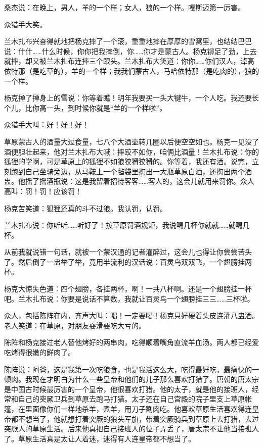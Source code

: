 \par 桑杰说：在晚上，男人，羊的一个样；女人，狼的一个样。嘎斯迈第一厉害。
\par 众猎手大笑。
\par 兰木扎布兴奋得就地把杨克摔了一个滚，重重地摔在厚厚的雪窝里，也结结巴巴说：什什……什么时候，你你把我摔倒，你……你才是蒙古人。杨克铆足了劲，上去就摔，却又被兰木扎布连摔三个跟头。兰木扎布大笑道：你你……你们汉人，淖高依特那（是吃草的），羊的一个样；我我们蒙古人，马哈依特那（是吃肉的），狼的一个样。
\par 杨克掸了掸身上的雪说：你等着瞧！明年我要买一头大犍牛，一个人吃。我还要长个儿，比你高一头，到时候你就是“羊的一个样啦”。
\par 众猎手大叫：好！好！好！
\par 草原蒙古人的酒量大过食量，七八个大酒壶转几圈以后便空空如也。杨克一见没了酒便胆壮起来，他对兰木扎布大喊：摔跤不如你，咱俩比酒量！兰木扎布说：你的狐狸的学啊，可是草原上的狐狸不如狼狡猾狡猾的。你等着，我还有酒。说完，立刻跑到自己坐骑旁边，从马鞍上一个毡袋里掏出一大瓶草原白酒，还掏出两个酒盅。他摇了摇酒瓶说：这是我留着招待客客……客人的，这会儿就用来罚你。众人高叫：罚！罚！应该罚！
\par 杨克苦笑道：狐狸还真的斗不过狼。我认罚，认罚。
\par 兰木扎布说：你听听……听好了！按草原罚酒规矩，我说喝几杯你就就……就喝几杯。
\par 从前我就说错一句话，就被一个蒙汉通的记者灌醉过，这会儿也得让你尝尝苦头了。然后倒了一盅举了举，竟用半流利的汉话说：百灵鸟双双飞，一个翅膀挂两杯。
\par 杨克大惊失色道：四个翅膀，各挂两杯，啊！一共八杯啊。还是一个翅膀挂一杯吧。兰木扎布说：你要是说话不算数，我就让百灵鸟一个翅膀挂三三……三杯啦。
\par 众人，包括陈阵在内，齐声大叫：喝！一定要喝！杨克只好硬着头皮连灌八盅酒。老人笑道：在草原，对朋友耍滑要吃大亏的。
\par 陈阵和杨克接过老人替他烤好的两串肉，吃得顺着嘴角直流羊血汤。两人都已经爱吃烤得很嫩的鲜肉了。
\par 陈阵说：阿爸，这是我第一次吃狼食，也是我活这么大，吃得最好吃，最痛快的一顿肉。我现在才明白为什么一些皇帝和他们的儿子那么喜欢打猎了。唐朝的唐太宗是中国古时候最厉害的一个皇帝，他很喜欢打猎。他的太子，就是他的接班人，经常和自己的突厥卫兵到草原去跑马打猎。太子还在自己宫殿的院子里支上草原帐篷，在里面像你们一样地杀羊，煮羊，用刀子割肉吃。他喜欢草原生活喜欢得连皇帝都不想当了，他就想打着突厥的狼头军旗，带着突厥骑兵到草原上去打猎，去过突厥人的草原生活。后来他真把自己接班人的位子弄丢了，唐太宗不让他当接班人了。草原生活真是太让人着迷，迷得有人连皇帝都不想当了。
